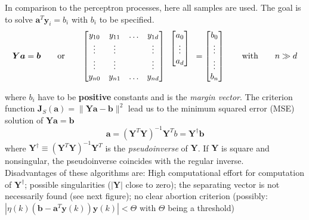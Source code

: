     In comparison to the perceptron processes, here all samples are used. 
    The goal is to solve $\bm a^T \bm y_i = b_i$ with $b_i$ to be specified.
    \begin{equation*}
    \bm Y \bm a = \bm b
    \qquad \text{or} \qquad
    \begin{bmatrix}
      y_{10} & y_{11} & \ldots & y_{1d}\\
      \vdots &\vdots & & \vdots\\
      \vdots &\vdots & & \vdots\\
      y_{n0} & y_{n1} & \ldots & y_{nd}\\
    \end{bmatrix}
    \begin{array}{c}
    \begin{bmatrix}
    	a_0\\
    	\vdots\\
    	a_d
    \end{bmatrix}\\
    \vphantom{\vdots}\\
    \end{array} = 
    \begin{bmatrix}
    	b_0\\
    	\vdots\\
    	\vdots\\
    	b_n
    \end{bmatrix} \qquad \text{with} \qquad n \gg d
    \end{equation*}
    
    where $b_i$ have to be \textbf{positive} constants and is the \emph{margin vector}. 
    The criterion function $\bm J_S(\bm a)=\|\bm Y \bm a - \bm b \|^2$ lead 
    us to the minimum squared error (MSE) solution of $\bm Y \bm a = \bm b$
    \begin{equation*}
        \bm a = (\bm Y^T \bm Y)^{-1} \bm Y^T b = \bm Y^\dagger \bm b
    \end{equation*}
    where $\bm Y^\dagger \equiv (\bm Y^T \bm Y)^{-1} \bm Y^T$ is the \emph{pseudoinverse} of $\bm Y$.
    If $\bm Y$ is square and nonsingular, the pseudoinverse coincides with the regular inverse. \\

    Disadvantages of these algorithms are: High computational effort for computation of $\bm Y^\dagger$;
    possible singularities ($|\bm Y|$ close to zero); the separating vector is not necessarily found (see next figure);
    no clear abortion criterion (possibly: $|\eta(k) (\bm b - \bm a^T \bm y(k)) \bm y(k)| < \Theta$ with $\Theta$ being a threshold)\\
    
